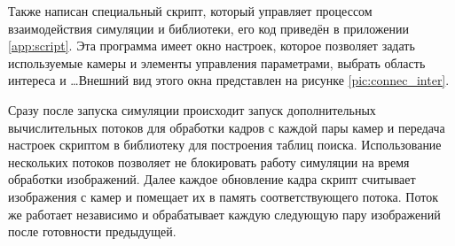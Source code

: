 Также написан специальный скрипт, который управляет процессом взаимодействия симуляции и библиотеки, 
его код приведён в приложении \ref{app:script}. Эта программа имеет окно настроек, которое позволяет задать
используемые камеры и элементы управления параметрами, выбрать область интереса и \dots Внешний вид этого 
окна представлен на рисунке \ref{pic:connec_inter}.


Сразу после запуска симуляции происходит запуск дополнительных вычислительных потоков для обработки 
кадров с каждой пары камер и передача настроек скриптом в библиотеку для построения таблиц поиска.           %
Использование нескольких потоков позволяет не блокировать работу симуляции на время обработки изображений.  
Далее каждое обновление кадра скрипт считывает изображения с камер и помещает их в память соответствующего 
потока. Поток же работает независимо и обрабатывает каждую следующую пару изображений после готовности 
предыдущей. 